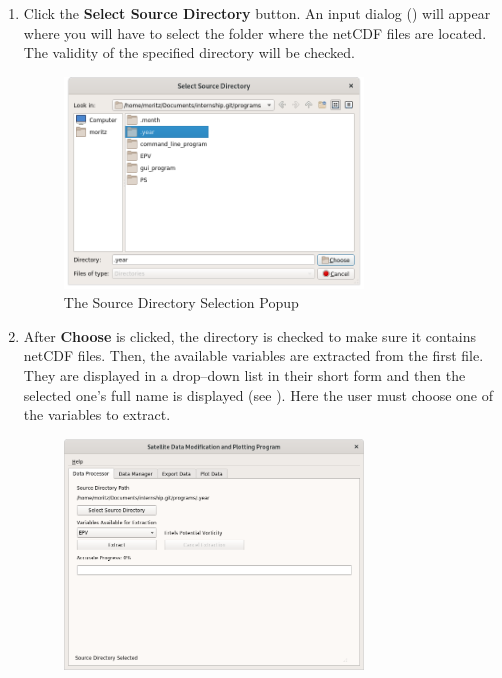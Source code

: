\documentclass[../00_main.tex]{subfiles}
\begin{document}
\begin{enumerate}
    \item Click the \textbf{Select Source Directory} button. An input dialog
        () will appear where you will have to select the folder 
        where the netCDF files are located. The validity of the specified 
        directory will be checked. 
            \begin{figure}[H]
                \center
                \includegraphics[width=0.75\textwidth]{../graphics/dp02}
                \caption{The Source Directory Selection Popup}
                \label{dp02}
            \end{figure}
    \item After \textbf{Choose} is clicked, the directory is checked to
        make sure it contains netCDF files. Then, the available variables are 
        extracted from the first file. They are displayed in a drop--down list 
        in their short form and then the selected one's full name is displayed 
        (see ). Here the user must choose one of the variables to 
        extract. 
        \begin{figure}[H]
            \center
            \includegraphics[width=0.75\textwidth]{../graphics/dp03}

\end{figure}
\end{enumerate}
\end{document}
